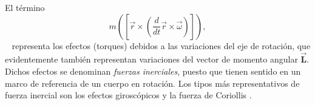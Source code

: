 El término
$$
m\left(\left[\vec{r}\times\left( \frac{d}{dt}\vec{r}\times \vec{\omega}\right)\right]\right),
$$\
representa los efectos (torques) debidos a las variaciones del eje de rotación, que evidentemente también representan variaciones del vector de momento angular $\vec{\mathbf{L}}$. Dichos efectos se denominan \emph{fuerzas inerciales}, puesto que tienen sentido en un marco de referencia de un cuerpo en rotación. Los tipos más representativos de fuerza inercial son los efectos giroscópicos y la fuerza de Coriollis \citep{sears2005fisica}.
